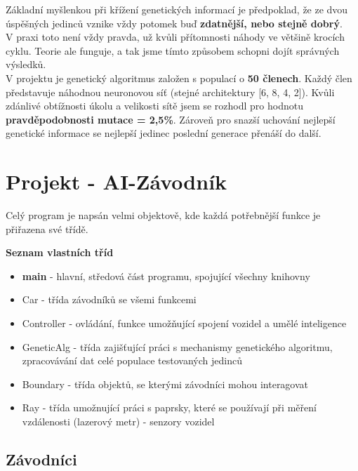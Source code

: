 \documentclass[a4paper,12pt]{article}
\begin{document}
        \vspace{0.75cm}
        Základní myšlenkou při křížení genetických informací je předpoklad, že ze dvou úspěšných
        jedinců vznike vždy potomek buď \textbf{zdatnější, nebo stejně dobrý}.\\
        V praxi toto není vždy pravda, už kvůli přítomnosti náhody ve většině krocích cyklu. 
        Teorie ale funguje, a tak jsme tímto způsobem schopni dojít správných výsledků.
        \\

        V projektu je genetický algoritmus založen s populací o \textbf{50 členech}. 
        Každý člen představuje náhodnou neuronovou síť (stejné architektury [6, 8, 4, 2]).
        Kvůli zdánlivé obtížnosti úkolu a velikosti sítě jsem se rozhodl pro hodnotu 
        \textbf{pravděpodobnosti mutace = 2,5\%}. Zároveň pro snazší uchování nejlepší 
        genetické informace se nejlepší jedinec poslední generace přenáší do další.

    \pagebreak
    \section{Projekt - AI-Závodník}
        Celý program je napsán velmi objektově, kde každá potřebnější funkce je přiřazena
        své třídě.

        \textbf{Seznam vlastních tříd}
        \begin{itemize}
            \item \textbf{main} - hlavní, středová část programu, spojující všechny knihovny
            \item Car - třída závodníků se všemi funkcemi
            \item Controller - ovládání, funkce umožňující spojení vozidel a umělé inteligence
            \item GeneticAlg - třída zajišťující práci s mechanismy genetického algoritmu,
                zpracovávání dat celé populace testovaných jedinců
            \item Boundary - třída objektů, se kterými závodníci mohou interagovat
            \item Ray - třída umožnující práci s paprsky, které se používají při měření vzdálenosti
                (lazerový metr) - senzory vozidel
        \end{itemize}

        \subsection{Závodníci}
\end{document}
